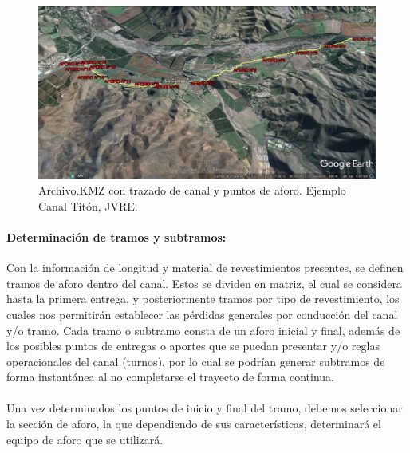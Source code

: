 \documentclass[]{article}
\begin{document}
\begin{figure}[h]
\centering
\includegraphics[width=\textwidth]{images/puntos_de_aforo_kml2.eps}
\caption{Archivo.KMZ con trazado de canal y puntos de aforo. Ejemplo Canal Titón, JVRE.}
\label{kmz}
\end{figure}

\paragraph{Determinación de tramos y subtramos:} Con la información de longitud y material de revestimientos presentes, se definen tramos de aforo dentro del canal. Estos se dividen en matriz, el cual se considera hasta la primera entrega, y posteriormente tramos por tipo de revestimiento, los cuales nos permitirán establecer las pérdidas generales por conducción del canal y/o tramo. Cada tramo o subtramo consta de un aforo inicial y final, además de los posibles puntos de entregas o aportes que se puedan presentar y/o reglas operacionales del canal (turnos), por lo cual se podrían generar subtramos de forma instantánea al no completarse el trayecto de forma continua.\\
\\
Una vez determinados los puntos de inicio y final del tramo, debemos seleccionar la sección de aforo, la que dependiendo de sus características, determinará el equipo de aforo que se utilizará. 
\end{document}
